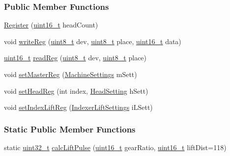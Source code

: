 \subsubsection*{Public Member Functions}
\begin{DoxyCompactItemize}
\item 
\mbox{\hyperlink{classRegister_a2373bcab5c0881b7bc97f7e2863a816f}{Register}} (\mbox{\hyperlink{settings_8h_a017dd44e68049ffdd31500a8cd01ba68}{uint16\+\_\+t}} head\+Count)
\item 
void \mbox{\hyperlink{classRegister_a6c51e7d73be200ba0c9b72b1407b6fe2}{write\+Reg}} (\mbox{\hyperlink{settings_8h_a48091a1e52849b0871df2f7081be2e38}{uint8\+\_\+t}} dev, \mbox{\hyperlink{settings_8h_a48091a1e52849b0871df2f7081be2e38}{uint8\+\_\+t}} place, \mbox{\hyperlink{settings_8h_a017dd44e68049ffdd31500a8cd01ba68}{uint16\+\_\+t}} data)
\item 
\mbox{\hyperlink{settings_8h_a017dd44e68049ffdd31500a8cd01ba68}{uint16\+\_\+t}} \mbox{\hyperlink{classRegister_a5d9ef3f36154606c34d829e77daa1e32}{read\+Reg}} (\mbox{\hyperlink{settings_8h_a48091a1e52849b0871df2f7081be2e38}{uint8\+\_\+t}} dev, \mbox{\hyperlink{settings_8h_a48091a1e52849b0871df2f7081be2e38}{uint8\+\_\+t}} place)
\item 
void \mbox{\hyperlink{classRegister_a992283907794ce91287b3c4357385aa4}{set\+Master\+Reg}} (\mbox{\hyperlink{classMachineSettings}{Machine\+Settings}} m\+Sett)
\item 
void \mbox{\hyperlink{classRegister_a844f6c43ab446e60d80fab2fff03442d}{set\+Head\+Reg}} (int index, \mbox{\hyperlink{classHeadSetting}{Head\+Setting}} h\+Sett)
\item 
void \mbox{\hyperlink{classRegister_a7c0d35bc6f9c7d944c178a0b6855072e}{set\+Index\+Lift\+Reg}} (\mbox{\hyperlink{classIndexerLiftSettings}{Indexer\+Lift\+Settings}} i\+L\+Sett)
\end{DoxyCompactItemize}
\subsubsection*{Static Public Member Functions}
\begin{DoxyCompactItemize}
\item 
static \mbox{\hyperlink{settings_8h_a4196118492a3b1493c81f250e90af775}{uint32\+\_\+t}} \mbox{\hyperlink{classRegister_a72e4a0b4645d2afa608d263ece004dec}{calc\+Lift\+Pulse}} (\mbox{\hyperlink{settings_8h_a017dd44e68049ffdd31500a8cd01ba68}{uint16\+\_\+t}} gear\+Ratio, \mbox{\hyperlink{settings_8h_a017dd44e68049ffdd31500a8cd01ba68}{uint16\+\_\+t}} lift\+Dist=118)
\end{DoxyCompactItemize}

